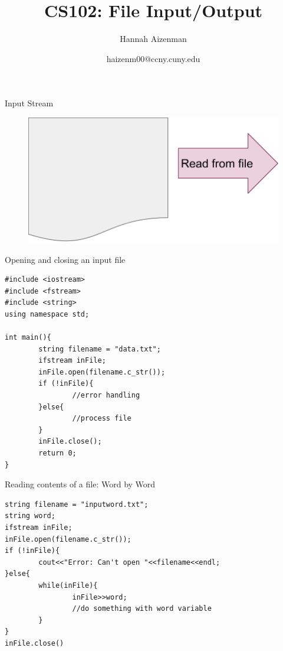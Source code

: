 \documentclass[xcolor={dvipsnames}]{beamer}
\begin{document}
\title{ CS102: File Input/Output}
\author{Hannah Aizenman}
\date{haizenm00@ccny.cuny.edu}


\begin{frame}
	\titlepage
\end{frame}

\begin{frame}{Input Stream}
	\begin{figure}
		\includegraphics[width=1\textwidth]{read}
	\end{figure}
\end{frame}

\begin{frame}[fragile]{Opening and closing an input file}
\begin{verbatim}	
#include <iostream>
#include <fstream>
#include <string>
using namespace std;

int main(){
        string filename = "data.txt";
        ifstream inFile;
        inFile.open(filename.c_str());
        if (!inFile){
                //error handling
        }else{
                //process file
        }
        inFile.close();
        return 0;
}
\end{verbatim}
\end{frame}

\begin{frame}[fragile]{Reading contents of a file: Word by Word}
\begin{verbatim}
string filename = "inputword.txt";
string word;
ifstream inFile;
inFile.open(filename.c_str());
if (!inFile){
        cout<<"Error: Can't open "<<filename<<endl;
}else{
        while(inFile){
                inFile>>word;
                //do something with word variable
        }
}
inFile.close()
\end{verbatim}
\end{frame}
\end{document}
